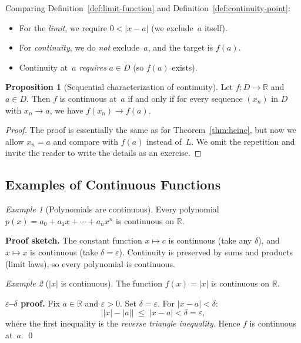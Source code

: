 \documentclass[12pt,a4paper,openany]{book}
\theoremstyle{definition}
\newtheorem{proposition}{Proposition}[chapter]
\theoremstyle{remark}
\newtheorem{example}{Example}[chapter]
\begin{document}
\begin{tcolorbox}[colback=yellow!5,colframe=orange!60!black,
  title={Limit vs.\ continuity}]
Comparing Definition~\ref{def:limit-function} and
Definition~\ref{def:continuity-point}:
\begin{itemize}[nosep]
\item For the \emph{limit}, we require $0<|x-a|$
  (we exclude~$a$ itself).
\item For \emph{continuity}, we do \emph{not} exclude~$a$,
  and the target is $f(a)$.
\item Continuity at~$a$ \emph{requires} $a\in D$ (so $f(a)$ exists).
\end{itemize}
\end{tcolorbox}

\begin{proposition}[Sequential characterization of continuity]
\label{prop:seq-continuity}
Let $f\colon D\to\mathbb{R}$ and $a\in D$.  Then $f$ is continuous
at~$a$ if and only if for every sequence $(x_n)$ in $D$ with $x_n\to a$,
we have $f(x_n)\to f(a)$.
\end{proposition}

\begin{proof}
The proof is essentially the same as for Theorem~\ref{thm:heine}, but
now we allow $x_n=a$ and compare with $f(a)$ instead of~$L$.  We omit
the repetition and invite the reader to write the details as an exercise.
\end{proof}

\subsection{Examples of Continuous Functions}

\begin{example}[Polynomials are continuous]\label{ex:poly-cont}
Every polynomial $p(x)=a_0+a_1 x+\cdots+a_n x^n$ is continuous on
$\mathbb{R}$.

\medskip\noindent
\textbf{Proof sketch.}\;
The constant function $x\mapsto c$ is continuous (take any $\delta$),
and $x\mapsto x$ is continuous (take $\delta=\varepsilon$).
Continuity is preserved by sums and products (limit laws), so every
polynomial is continuous.
\end{example}

\begin{example}[$|x|$ is continuous]\label{ex:abs-cont}
The function $f(x)=|x|$ is continuous on $\mathbb{R}$.

\medskip\noindent
\textbf{$\varepsilon$--$\delta$ proof.}\;
Fix $a\in\mathbb{R}$ and $\varepsilon>0$.  Set $\delta=\varepsilon$.
For $|x-a|<\delta$:
\[
  \bigl||x|-|a|\bigr| \;\le\; |x-a| < \delta = \varepsilon,
\]
where the first inequality is the \emph{reverse triangle inequality}.
Hence $f$ is continuous at~$a$.  \qed
\end{example}
\end{document}
